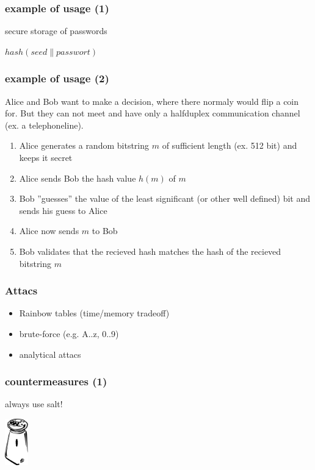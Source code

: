 \begin{frame}
\frametitle{example of usage (1)}
	secure storage of passwords
	\par
	\begin{center}$hash( seed \parallel passwort )$\end{center}
\end{frame}

\begin{frame}
	\frametitle{example of usage (2)}
	Alice and Bob want to make a decision, where there normaly would flip a coin for.
	But they can not meet and have only a halfduplex communication channel (ex. a telephoneline).
	\begin{enumerate}
		\item<2-> Alice generates a random bitstring $m$ of sufficient length (ex. 512 bit) and keeps it secret
		\item<3-> Alice sends Bob the hash value $h(m)$ of $m$
		\item<4-> Bob ''guesses'' the value of the least significant (or other well defined) bit and sends his guess to Alice
		\item<5-> Alice now sends $m$ to Bob
		\item<6-> Bob validates that the recieved hash matches the hash of the recieved bitstring $m$
	\end{enumerate}	
\end{frame}

\begin{frame}
\frametitle{Attacs}
	\begin{itemize}
		\item Rainbow tables (time/memory tradeoff)
		\item brute-force (e.g. A..z, 0..9)
		\item analytical attacs
	\end{itemize}
\end{frame}

\begin{frame}
\frametitle{countermeasures (1)}
	\begin{center}
		\large{always use salt!}
		\par
		\includegraphics[width=1cm,height=2cm]{salt}
	\end{center}
\end{frame}

